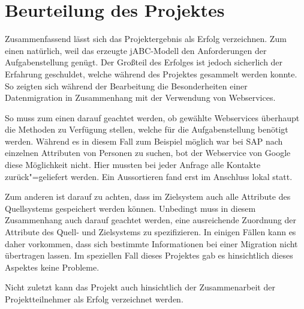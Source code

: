 \section{Beurteilung des Projektes}
\label{sec:beurteilung}

Zusammenfassend lässt sich das Projektergebnis als Erfolg verzeichnen. Zum einen natürlich, weil das erzeugte jABC-Modell den Anforderungen der Aufgabenstellung genügt. Der Großteil des Erfolges ist jedoch sicherlich der Erfahrung geschuldet, welche während des Projektes gesammelt werden konnte. So zeigten sich während der Bearbeitung die Besonderheiten einer Datenmigration in Zusammenhang mit der Verwendung von Webservices. 

So muss zum einen darauf geachtet werden, ob gewählte Webservices überhaupt die Methoden zu Verfügung stellen, welche für die Aufgabenstellung benötigt werden. Während es in diesem Fall zum Beispiel möglich war bei SAP nach einzelnen Attributen von Personen zu suchen, bot der Webservice von Google diese Möglichkeit nicht. Hier mussten bei jeder Anfrage alle Kontakte zurück"=geliefert werden. Ein Aussortieren fand erst im Anschluss lokal statt.

Zum anderen ist darauf zu achten, dass im Zielsystem auch alle Attribute des Quellsystems gespeichert werden können. Unbedingt muss in diesem Zusammenhang auch darauf geachtet werden, eine ausreichende Zuordnung der Attribute des Quell- und Zielsystems zu spezifizieren. In einigen Fällen kann es daher vorkommen, dass sich bestimmte Informationen bei einer Migration nicht übertragen lassen. Im speziellen Fall dieses Projektes gab es hinsichtlich dieses Aspektes keine Probleme.

Nicht zuletzt kann das Projekt auch hinsichtlich der Zusammenarbeit der Projektteilnehmer als Erfolg verzeichnet werden. 